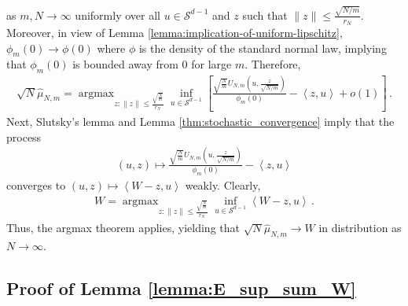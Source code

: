 \documentclass[12pt]{article}
\providecommand{\argmax}{\mathop\mathrm{arg max}} %
\newcommand{\wh}{\widehat}
\def\l{\left}
\def\r{\right}
\newcommand{\dotp}[2]{\left\langle#1,#2\right\rangle}
\newcommand{\scolor}[1]{\textcolor{red}{#1}} %
\theoremstyle{thmstyletwo}%
\theoremstyle{thmstylethree}%
\begin{document}
as $m,N \rightarrow \infty$ uniformly over all $u \in \mathcal{S}^{d-1}$ and $z$ such that $\|z\| \leq \frac{\sqrt{N/m}}{r_N}$. Moreover, in view of Lemma \ref{lemma:implication-of-uniform-lipschitz}, $\phi_m(0) \rightarrow \phi(0)$ where $\phi$ is the density of the standard normal law, implying that $\phi_m(0)$ is bounded away from $0$ for large $m$. Therefore, 
\begin{align*}
    \sqrt{N}\wh\mu_{N,m} = \argmax_{z : \|z\| \leq \frac{\sqrt{\frac{N}{m}}}{r_N}}\inf_{u \in \mathcal{S}^{d-1}} \l[\frac{\sqrt{\frac{N}{m}}  U_{N,m}\l(u, \frac{z}{\sqrt{N/m}}\r)}{\phi_m(0)} -  \dotp{z}{u} + o(1)\r] \,.
\end{align*}
Next, Slutsky's lemma and Lemma \ref{thm:stochastic_convergence} imply that the process 
\begin{align*}
    (u,z) \mapsto \frac{\sqrt{\frac{N}{m}}  U_{N,m}\l(u, \frac{z}{\sqrt{N/m}}\r)}{\phi_m(0)} -  \dotp{z}{u}
\end{align*}
converges to $(u,z) \mapsto \dotp{W - z}{u}$ weakly. Clearly,
\begin{align*}
    W = \argmax_{z : \|z\| \leq \frac{\sqrt{\frac{N}{m}}}{r_N}}\inf_{u \in \mathcal{S}^{d-1}} \dotp{W - z}{u}\,.
\end{align*}
Thus, the argmax theorem \cite{wellner2013weak} applies, yielding that $\sqrt{N}\wh\mu_{N,m} \rightarrow W$ in distribution as $N \rightarrow \infty$.


\subsection{Proof of Lemma \ref{lemma:E_sup_sum_W}}
\label{proof:lemma:E_sup_sum_W}
\end{document}
